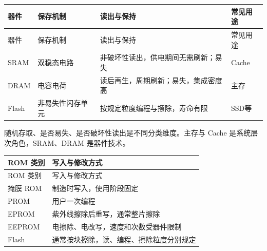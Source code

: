 \par\smallskip
\begin{wideblock}
{\fontsize{9.3}{12}\selectfont\setlength{\tabcolsep}{2.5pt}\setlength{\LTleft}{0pt}\setlength{\LTright}{0pt}
\begin{longtable}{@{}>{\raggedright\arraybackslash}p{}>{\raggedright\arraybackslash}p{}>{\raggedright\arraybackslash}p{}>{\raggedright\arraybackslash}p{}@{}}
\toprule
器件 & 保存机制 & 读出与保持 & 常见用途 \\

\midrule\endfirsthead\toprule
器件 & 保存机制 & 读出与保持 & 常见用途 \\

\midrule\endhead\bottomrule\endfoot
SRAM & 双稳态电路 & 非破坏性读出，供电期间无需刷新；易失 & Cache \\

DRAM & 电容电荷 & 读后再生，周期刷新；易失，集成密度高 & 主存 \\

Flash & 非易失性闪存单元 & 按规定粒度编程与擦除，寿命有限 & SSD等 \\

\end{longtable}}
\end{wideblock}
\par\smallskip

随机存取、是否易失、是否破坏性读出是不同分类维度。主存与 Cache 是系统层次角色，SRAM、DRAM 是器件技术。

\par\smallskip
{\fontsize{9.3}{12}\selectfont\setlength{\tabcolsep}{2.5pt}\setlength{\LTleft}{0pt}\setlength{\LTright}{0pt}
\begin{longtable}{@{}>{\raggedright\arraybackslash}p{}>{\raggedright\arraybackslash}p{}@{}}
\toprule
ROM 类别 & 写入与修改方式 \\

\midrule\endfirsthead\toprule
ROM 类别 & 写入与修改方式 \\

\midrule\endhead\bottomrule\endfoot
掩膜 ROM & 制造时写入，使用阶段固定 \\

PROM & 用户一次编程 \\

EPROM & 紫外线擦除后重写，通常整片擦除 \\

EEPROM & 电擦除、电改写，速度和次数受器件限制 \\

Flash & 通常按块擦除，读、编程、擦除粒度分别规定 \\

\end{longtable}}
\par\smallskip

